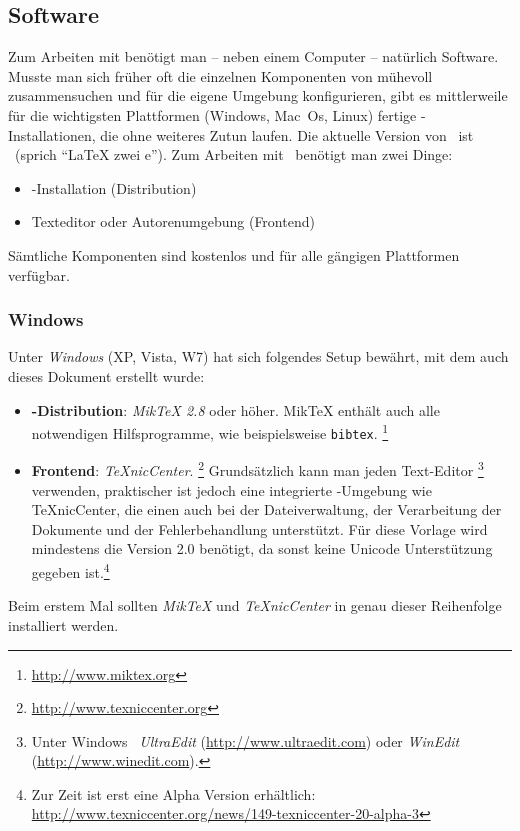 \subsection{Software}

Zum Arbeiten mit \latex benötigt man -- neben einem Computer -- natürlich Software. Musste man sich früher oft die einzelnen Komponenten von \latex mühevoll zusammensuchen und für die eigene Umgebung konfigurieren, gibt es mittlerweile für die wichtigsten Plattformen (Windows, Mac~Os, Linux) fertige \latex-Installationen, die ohne weiteres Zutun laufen. Die aktuelle Version von \latex\ ist \LaTeXe\ (sprich "`LaTeX zwei e"'). 
Zum Arbeiten mit \latex\ benötigt man zwei Dinge:
%
\begin{itemize}
\item \latex-Installation (Distribution)
\item Texteditor oder Autorenumgebung (Frontend)
\end{itemize}
%
Sämtliche Komponenten sind kostenlos und für alle gängigen Plattformen verfügbar.


\subsubsection{Windows}

Unter \emph{Windows} (XP, Vista, W7) hat sich folgendes Setup bewährt,
mit dem \ua auch dieses Dokument erstellt wurde:
%
\begin{itemize}
\item \textbf{\latex-Distribution}: \emph{MikTeX 2.8} oder höher.
MikTeX enthält auch alle notwendigen Hilfsprogramme, wie beispielsweise {\tt bibtex}.%
\footnote{\url{http://www.miktex.org}}


\item \textbf{Frontend}: \emph{TeXnicCenter}.%
\footnote{\url{http://www.texniccenter.org}}
Grundsätzlich kann man jeden Text-Editor%
\footnote{Unter Windows \zB\ \emph{Ultra\-Edit} (\url{http://www.ultraedit.com})
oder \emph{WinEdit} (\url{http://www.winedit.com}).} verwenden, praktischer ist jedoch eine integrierte \latex-Umgebung wie TeXnicCenter, die einen auch bei 
der Dateiverwaltung, der Verarbeitung der Dokumente und der Fehlerbehandlung unterstützt. Für diese Vorlage wird mindestens die Version 2.0 benötigt, da sonst keine Unicode Unterstützung gegeben ist.\footnote{Zur Zeit ist erst eine Alpha Version erhältlich: \url{http://www.texniccenter.org/news/149-texniccenter-20-alpha-3}}
%
\end{itemize}
Beim erstem Mal sollten \emph{MikTeX} und \emph{TeXnicCenter} in genau dieser Reihenfolge installiert werden.


